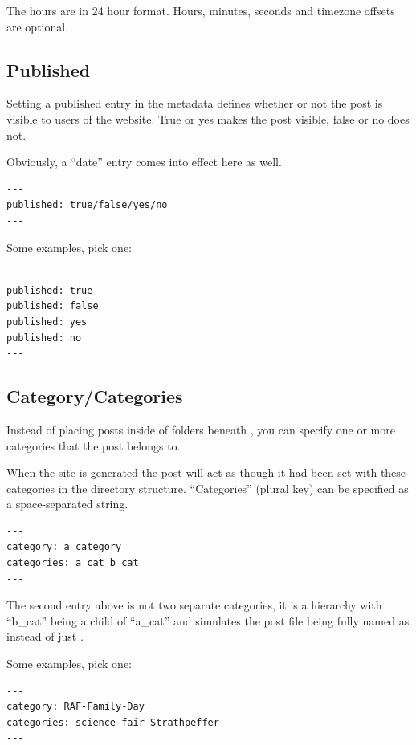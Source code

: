 The hours are in 24 hour format. Hours, minutes, seconds and timezone offsets are optional.


\subsection{Published}

Setting a published entry in the metadata defines whether or not the post is visible to users of the website. True or yes makes the post visible, false or no does not.

Obviously, a ``date'' entry comes into effect here as well.

\begin{lstlisting}[style=myText]
---
published: true/false/yes/no
---
\end{lstlisting}

Some examples, pick one:

\begin{lstlisting}[style=myText]
---
published: true
published: false
published: yes
published: no
---
\end{lstlisting}

\subsection{Category/Categories}

Instead of placing posts inside of folders beneath , you can specify one or more categories that the post belongs to.

When the site is generated the post will act as though it had been set with these categories in the directory structure. ``Categories'' (plural key) can be specified as a space-separated string.

\begin{lstlisting}[style=myText]
---
category: a_category
categories: a_cat b_cat
---
\end{lstlisting}

The second entry above is not two separate categories, it is a hierarchy with ``b\_cat'' being a child of ``a\_cat'' and simulates the post file being fully named as  instead of just .

Some examples, pick one:

\begin{lstlisting}[style=myText]
---
category: RAF-Family-Day
categories: science-fair Strathpeffer
---
\end{lstlisting}

